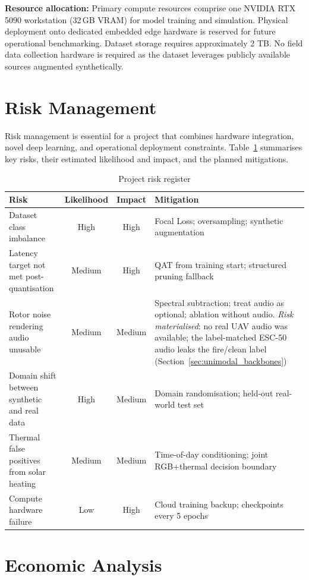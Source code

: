 \textbf{Resource allocation:} Primary compute resources comprise one NVIDIA RTX 5090 workstation (32\,GB VRAM) for model training and simulation. Physical deployment onto dedicated embedded edge hardware is reserved for future operational benchmarking. Dataset storage requires approximately 2 TB. No field data collection hardware is required as the dataset leverages publicly available sources augmented synthetically.

\section{Risk Management}

Risk management is essential for a project that combines hardware integration, novel deep learning, and operational deployment constraints. Table~\ref{tab:risk_register} summarises key risks, their estimated likelihood and impact, and the planned mitigations.

\begin{table}[H]
\centering
\caption{Project risk register}
\label{tab:risk_register}
\begin{tabular}{@{}p{4cm}ccp{4.5cm}@{}}
\toprule
\textbf{Risk} & \textbf{Likelihood} & \textbf{Impact} & \textbf{Mitigation} \\
\midrule
Dataset class imbalance & High & High & Focal Loss; oversampling; synthetic augmentation \\
Latency target not met post-quantisation & Medium & High & QAT from training start; structured pruning fallback \\
Rotor noise rendering audio unusable & Medium & Medium & Spectral subtraction; treat audio as optional; ablation without audio. \textit{Risk materialised}: no real UAV audio was available; the label-matched ESC-50 audio leaks the fire/clean label (Section~\ref{sec:unimodal_backbones}) \\
Domain shift between synthetic and real data & High & Medium & Domain randomisation; held-out real-world test set \\
Thermal false positives from solar heating & Medium & Medium & Time-of-day conditioning; joint RGB+thermal decision boundary \\
Compute hardware failure & Low & High & Cloud training backup; checkpoints every 5 epochs \\
\bottomrule
\end{tabular}
\end{table}

\section{Economic Analysis}

